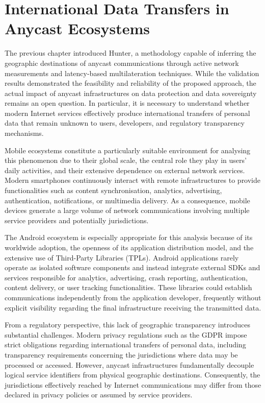 \chapter{International Data Transfers in Anycast Ecosystems}
\label{ch:anycast_experiments}

The previous chapter introduced Hunter, a methodology capable of inferring the geographic destinations of anycast communications through active network measurements and latency-based multilateration techniques. While the validation results demonstrated the feasibility and reliability of the proposed approach, the actual impact of anycast infrastructures on data protection and data sovereignty remains an open question. In particular, it is necessary to understand whether modern Internet services effectively produce international transfers of personal data that remain unknown to users, developers, and regulatory transparency mechanisms.

Mobile ecosystems constitute a particularly suitable environment for analysing this phenomenon due to their global scale, the central role they play in users' daily activities, and their extensive dependence on external network services. Modern smartphones continuously interact with remote infrastructures to provide functionalities such as content synchronisation, analytics, advertising, authentication, notifications, or multimedia delivery. As a consequence, mobile devices generate a large volume of network communications involving multiple service providers and potentially jurisdictions.

The Android ecosystem is especially appropriate for this analysis because of its worldwide adoption, the openness of its application distribution model, and the extensive use of Third-Party Libraries (TPLs). Android applications rarely operate as isolated software components and instead integrate external SDKs and services responsible for analytics, advertising, crash reporting, authentication, content delivery, or user tracking functionalities. These libraries could establish communications independently from the application developer, frequently without explicit visibility regarding the final infrastructure receiving the transmitted data.

From a regulatory perspective, this lack of geographic transparency introduces substantial challenges. Modern privacy regulations such as the GDPR \cite{REGULATIONSRelevance} impose strict obligations regarding international transfers of personal data, including transparency requirements concerning the jurisdictions where data may be processed or accessed. However, anycast infrastructures fundamentally decouple logical service identifiers from physical geographic destinations. Consequently, the jurisdictions effectively reached by Internet communications may differ from those declared in privacy policies or assumed by service providers.

